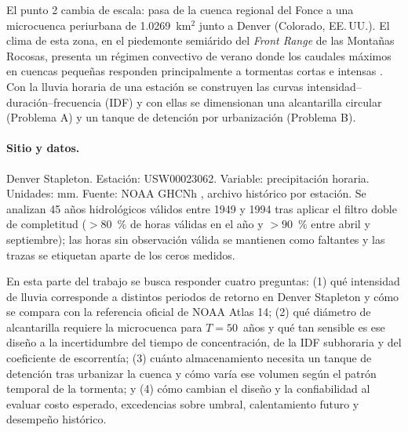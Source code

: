 
El punto 2 cambia de escala: pasa de la cuenca regional del Fonce a una microcuenca periurbana de 1.0269~km$^2$
junto a Denver (Colorado, EE.\,UU.). El clima de esta zona, en el piedemonte semiárido del \emph{Front Range} de las
Montañas Rocosas, presenta un régimen convectivo de verano donde los caudales máximos en cuencas pequeñas responden
principalmente a tormentas cortas e intensas \citep{perica2013}. Con la lluvia horaria de una estación se construyen
las curvas intensidad--duración--frecuencia (IDF) y con ellas se dimensionan una alcantarilla circular (Problema A) y
un tanque de detención por urbanización (Problema B).

\paragraph{Sitio y datos.} Denver Stapleton. Estación: USW00023062. Variable: precipitación horaria. Unidades: mm.
Fuente: NOAA GHCNh \citep{menne2023}, archivo histórico por estación. Se analizan 45 años hidrológicos válidos entre
1949 y 1994 tras aplicar el filtro doble de completitud ($>80$~\% de horas válidas en el año y $>90$~\% entre abril y
septiembre); las horas sin observación válida se mantienen como faltantes y las trazas se etiquetan aparte de los
ceros medidos.

En esta parte del trabajo se busca responder cuatro preguntas: (1) qué intensidad de lluvia corresponde a distintos
periodos de retorno en Denver Stapleton y cómo se compara con la referencia oficial de NOAA Atlas 14; (2) qué diámetro
de alcantarilla requiere la microcuenca para $T = 50$~años y qué tan sensible es ese diseño a la incertidumbre del
tiempo de concentración, de la IDF subhoraria y del coeficiente de escorrentía; (3) cuánto almacenamiento necesita un
tanque de detención tras urbanizar la cuenca y cómo varía ese volumen según el patrón temporal de la tormenta; y (4)
cómo cambian el diseño y la confiabilidad al evaluar costo esperado, excedencias sobre umbral, calentamiento futuro y
desempeño histórico.
